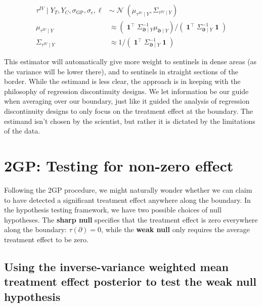 \documentclass[letter]{article}
\newcommand{\genericdel}[3]{%
      \left#1#3\right#2
    }
\newcommand{\del}[1]{\genericdel(){#1}}
\DeclareMathOperator{\normal}{\mathcal{N}}
\DeclareMathOperator{\ones}{\mathbf{1}}
\newcommand{\trans}{^{\intercal}}
\newcommand{\sigmaf}{\sigma_{\mathrm{GP}}}
\newcommand{\sigman}{\sigma_{\epsilon}}
\newcommand{\boundary}{\partial}
\newcommand{\sentinels}{\bm{\boundary}}
\newcommand{\invvar}{\tau^{IV}}
\begin{document}
\begin{equation}
\label{eq:invvar}
\begin{split}
    \invvar \mid Y_T, Y_C, \sigmaf, \sigman, \ell &\sim \normal\del{\mu_{\invvar \mid Y}, \Sigma_{\invvar \mid Y}} \\
    \mu_{\invvar \mid Y} &\approx \del{\ones\trans \Sigma_{\sentinels \mid Y}^{-1} \mu_{\sentinels \mid Y}} \big/ \del{\ones\trans \Sigma_{\sentinels \mid Y}^{-1} \ones}  \\
    \Sigma_{\invvar \mid Y} &\approx 1 \big/ \del{\ones\trans \Sigma_{\sentinels \mid Y}^{-1} \ones}
\end{split}\end{equation}

This estimator will automatically give more weight to sentinels in dense areas (as the variance will be lower there), and to sentinels in straight sections of the border.
While the estimand is less clear, the approach is in keeping with the philosophy of regression discontinuity designs.
We let information be our guide when averaging over our boundary, just like it guided the analysis of regression discontinuity designs to only focus on the treatment effect at the boundary.
The estimand isn't chosen by the scientist, but rather it is dictated by the limitations of the data.
    


    	\section{2GP: Testing for non-zero effect}\label{gp-testing-for-non-zero-effect}

Following the 2GP procedure, we might naturally wonder whether we can claim to have detected a significant treatment effect anywhere along the boundary.
In the hypothesis testing framework, we have two possible choices of null hypotheses.
The \textbf{sharp null} specifies that the treatment effect is zero everywhere along the boundary:
\(\tau(\boundary)=0\),
while the \textbf{weak null} only requires the average treatment effect to be zero.

\subsection{Using the inverse-variance weighted mean treatment effect posterior to test the weak null hypothesis}\label{using-the-inverse-variance-weighted-mean-treatment-effect-posterior-to-test-the-weak-null-hypothesis}
\end{document}
